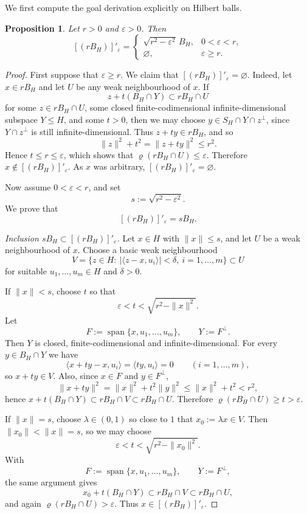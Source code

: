 \documentclass[reqno,11pt]{amsart}
\theoremstyle{plain}
\newtheorem{proposition}[theorem]{Proposition}
\theoremstyle{definition}
\theoremstyle{remark}
\renewcommand{\le}{\leqslant}
\renewcommand{\ge}{\geqslant}
\begin{document}
We first compute the goal derivation explicitly on Hilbert balls.

\begin{proposition}\label{prop:Hilbert-goal}
Let $r>0$ and $\varepsilon>0$. Then
\[
[(rB_H)]'_{\varepsilon}
=
\begin{cases}
\sqrt{r^2-\varepsilon^2}\,B_H,& 0<\varepsilon<r,\\[1mm]
\varnothing,& \varepsilon\ge r.
\end{cases}
\]
\end{proposition}

\begin{proof}
First suppose that $\varepsilon\ge r$. We claim that
$[(rB_H)]'_{\varepsilon}=\varnothing$.
Indeed, let $x\in rB_H$ and let $U$ be any weak neighbourhood of $x$.
If
\[
z+t(B_H\cap Y)\subset rB_H\cap U
\]
for some $z\in rB_H\cap U$, some closed finite-codimensional infinite-dimensional
subspace $Y\le H$, and some $t>0$, then we may choose
$y\in S_H\cap Y\cap z^{\perp}$, since $Y\cap z^\perp$ is still infinite-dimensional.
Thus $z+ty\in rB_H$, and so
\[
\|z\|^2+t^2=\|z+ty\|^2\le r^2.
\]
Hence $t\le r\le\varepsilon$, which shows that
$\varrho(rB_H\cap U)\le\varepsilon$. Therefore $x\notin[(rB_H)]'_{\varepsilon}$.
As $x$ was arbitrary, $[(rB_H)]'_{\varepsilon}=\varnothing$.

Now assume $0<\varepsilon<r$, and set
\[
s:=\sqrt{r^2-\varepsilon^2}.
\]
We prove that
\[
[(rB_H)]'_{\varepsilon}=sB_H.
\]

\smallskip
\noindent\emph{Inclusion $sB_H\subset[(rB_H)]'_{\varepsilon}$.}
Let $x\in H$ with $\|x\|\le s$, and let $U$ be a weak neighbourhood of $x$.
Choose a basic weak neighbourhood
\[
V
=
\bigl\{
z\in H:\ |\langle z-x,u_i\rangle|<\delta,\ i=1,\dots,m
\bigr\}
\subset U
\]
for suitable $u_1,\dots,u_m\in H$ and $\delta>0$.

If $\|x\|<s$, choose $t$ so that
\[
\varepsilon<t<\sqrt{r^2-\|x\|^2}.
\]
Let
\[
F:=\operatorname{span}\{x,u_1,\dots,u_m\},
\qquad
Y:=F^\perp.
\]
Then $Y$ is closed, finite-codimensional and infinite-dimensional.  For every
$y\in B_H\cap Y$ we have
\[
\langle x+ty-x,u_i\rangle=\langle ty,u_i\rangle=0
\qquad(i=1,\dots,m),
\]
so $x+ty\in V$.  Also, since $x\in F$ and $y\in F^\perp$,
\[
\|x+ty\|^2=\|x\|^2+t^2\|y\|^2\le \|x\|^2+t^2<r^2,
\]
hence $x+t(B_H\cap Y)\subset rB_H\cap V\subset rB_H\cap U$.  Therefore
$\varrho(rB_H\cap U)\ge t>\varepsilon$.

If $\|x\|=s$, choose $\lambda\in(0,1)$ so close to $1$ that
$x_0:=\lambda x\in V$.  Then $\|x_0\|<\|x\|=s$, so we may choose
\[
\varepsilon<t<\sqrt{r^2-\|x_0\|^2}.
\]
With
\[
F:=\operatorname{span}\{x,u_1,\dots,u_m\},
\qquad
Y:=F^\perp,
\]
the same argument gives
\[
x_0+t(B_H\cap Y)\subset rB_H\cap V\subset rB_H\cap U,
\]
and again $\varrho(rB_H\cap U)>\varepsilon$.
Thus $x\in[(rB_H)]'_{\varepsilon}$.


\end{proof}
\end{document}
